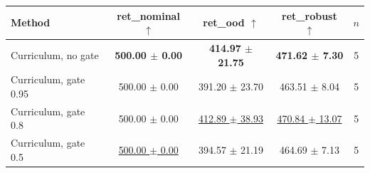 \begin{tabular}{lcccc}
\toprule
Method & ret\_nominal $\uparrow$ & ret\_ood $\uparrow$ & ret\_robust $\uparrow$ & $n$ \\
\midrule
Curriculum, no gate & \textbf{500.00 $\pm$ 0.00} & \textbf{414.97 $\pm$ 21.75} & \textbf{471.62 $\pm$ 7.30} & 5 \\
Curriculum, gate 0.95 & 500.00 $\pm$ 0.00 & 391.20 $\pm$ 23.70 & 463.51 $\pm$ 8.04 & 5 \\
Curriculum, gate 0.8 & 500.00 $\pm$ 0.00 & \underline{412.89 $\pm$ 38.93} & \underline{470.84 $\pm$ 13.07} & 5 \\
Curriculum, gate 0.5 & \underline{500.00 $\pm$ 0.00} & 394.57 $\pm$ 21.19 & 464.69 $\pm$ 7.13 & 5 \\
\bottomrule
\end{tabular}
